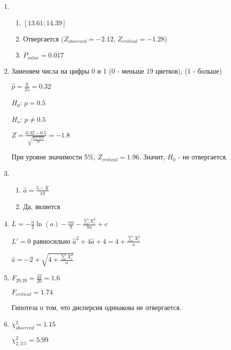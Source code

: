 \begin{enumerate}
\item
\begin{enumerate}
\item $[13.61;14.39]$
\item Отвергается ($Z_{observed}=-2.12$, $Z_{critical}=-1.28$)
\item $P_{value}=0.017$
\end{enumerate}
\item Заменяем числа на цифры 0 и 1 (0 - меньше 19 цветков), (1 - больше)

$\hat{p}=\frac{8}{25}=0.32$

$H_{0}$: $p=0.5$

$H_{a}$: $p\neq 0.5$

$Z=\frac{0.32-0.5}{\sqrt{\frac{0.5\cdot 0.5}{25}}}=-1.8$

При уровне значимости 5\%, $Z_{critical}=1.96$. Значит, $H_{0}$ - не отвергается.
\item
\begin{enumerate}
\item $\hat{a}=\frac{5-\bar{X}}{10}$
\item Да, является
\end{enumerate}
\item $L=-\frac{n}{2}\ln(a)-\frac{na}{8}-\frac{\sum X_{i}^{2}}{8a}+c$

$L'=0$ равносильно $\hat{a}^{2}+4\hat{a}+4=4+\frac{\sum X_{i}^{2}}{n}$

$\hat{a}=-2+\sqrt{4+\frac{\sum X_{i}^{2}}{n}}$
\item $F_{29.39}=\frac{32}{20}=1.6$

$F_{critical}=1.74$

Гипотеза о том, что дисперсия одинакова не отвергается.
\item $\chi^{2}_{observed}=1.15$

$\chi^{2}_{2,5\%}=5.99$


\end{enumerate}
